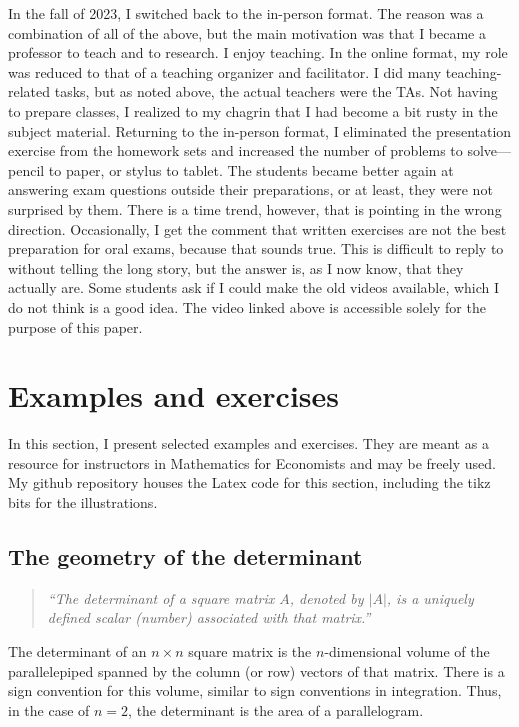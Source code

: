 \documentclass[10pt]{article}
\begin{document}
In the fall of 2023, I switched back to the in-person format. The reason was a combination of all of the above, but the main motivation was that I became a professor to teach and to research. I enjoy teaching. In the online format, my role was reduced to that of a teaching organizer and facilitator. I did many teaching-related tasks, but as noted above, the actual teachers were the TAs. Not having to prepare classes, I realized to my chagrin that I had become a bit rusty in the subject material. Returning to the in-person format, I eliminated the presentation exercise from the homework sets and increased the number of problems to solve---pencil to paper, or stylus to tablet. The students became better again at answering exam questions outside their preparations, or at least, they were not surprised by them. There is a time trend, however, that is pointing in the wrong direction. Occasionally, I get the comment that written exercises are not the best preparation for oral exams, because that sounds true. This is difficult to reply to without telling the long story, but the answer is, as I now know, that they actually are.  Some students ask if I could make the old videos available, which I do not think is a good idea. The video linked above is accessible solely for the purpose of this paper.



\section{Examples and exercises}

In this section, I present selected examples and exercises. They are meant as a resource for instructors in Mathematics for Economists and may be freely used. My github repository houses the Latex code for this section, including the tikz bits for the illustrations.

\subsection{The geometry of the determinant}

\begin{quote}\it
``The determinant of a square matrix $A$, denoted by $|A|$, is a uniquely defined scalar (number) associated with that matrix.'' \citep[p. 93]{Chiang1984}
\end{quote}

\smallskip

The determinant of an $n\times n$ square matrix is the $n$-dimensional volume of the parallelepiped spanned by the column (or row) vectors of that matrix. There is a sign convention for this volume, similar to sign conventions in integration. Thus, in the case of $n=2$, the determinant is the area of a parallelogram.
\end{document}
